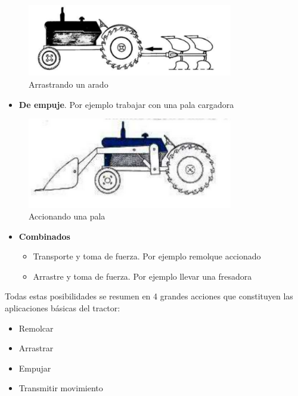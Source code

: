\documentclass[a4paper,12pt,oneside]{article}
\begin{document}
\begin{center}
\begin{figure}[htbp]
\centering
\includegraphics[width=0.8\textwidth]{./img_0009/tractor_arado.PNG}
\caption{Arrastrando un arado}
\end{figure}
\end{center}
\begin{itemize}
\item \textbf{De empuje}. Por ejemplo trabajar con una pala cargadora
\end{itemize}
\begin{center}
\begin{figure}[htbp]
\centering
\includegraphics[width=0.8\textwidth]{./img_0009/tractor_pala.PNG}
\caption{Accionando una pala}
\end{figure}
\end{center}
\begin{itemize}
\item \textbf{Combinados}
\begin{itemize}
\item Transporte y toma de fuerza. Por ejemplo remolque accionado
\item Arrastre y toma de fuerza. Por ejemplo llevar una fresadora
\end{itemize}
\end{itemize}

Todas estas posibilidades se resumen en 4 grandes acciones que constituyen las
aplicaciones básicas del tractor:
\begin{itemize}
\item Remolcar
\item Arrastrar
\item Empujar
\item Transmitir movimiento
\end{itemize}
\end{document}

